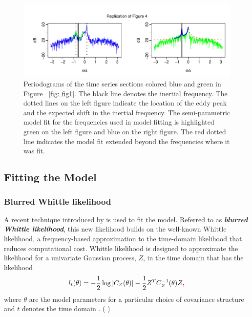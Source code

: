 \documentclass{stat572Style}
\newcommand{\vmadd}[1]{\textbf{\color{red}{#1}}}
\newcommand{\vmcomment}[1]{({\color{blue}{VM's comment:}} \textbf{\color{blue}{#1}})}
\begin{document}
\begin{figure}[h!]
  \centering
    \includegraphics[width=\textwidth]{ReplicatedFigures/fig4.pdf}
        \caption{Periodograms of the time series sections colored blue and green in Figure ~\ref{fig: fig1}. The black line denotes the inertial frequency.   The dotted lines on the left figure indicate the location of the eddy peak and the expected shift in the inertial frequency. The semi-parametric model fit for the frequencies used in model fitting is highlighted green on the left figure and blue on the right figure. The red dotted line indicates the model fit extended beyond the frequencies where it was fit. }
        	\label{fig: fig4}
\end{figure}


\subsection{Fitting the Model}
\subsubsection{Blurred Whittle likelihood}
\par A recent technique introduced by \citet{Sykulski2013}  is used to fit the model.
 Referred to as \textbf{\it{blurred Whittle likelihood}}, this new likelihood builds on the well-known Whittle likelihood, a frequency-based approximation  to the time-domain likelihood that reduces computational cost. 
  Whittle likelihood is designed to approximate the likelihood for a univariate Gaussian process, $Z$,  in the time domain that has the likelihood
\begin{align*}
l_{t}(\theta) = - \frac{1}{2} \log |C_{Z}(\theta) | - \frac{1}{2} Z^{T} C_{Z}^{-1}(\theta)Z\vmadd{,}
\end{align*}
where $\theta$ are the model parameters for a particular choice of covariance structure  and $t$ denotes the time domain  \citep{Sykulski2013}. \vmcomment{I should have mentioned this earlier in the test that all vectors and matrices need to be bolded.}
\end{document}
